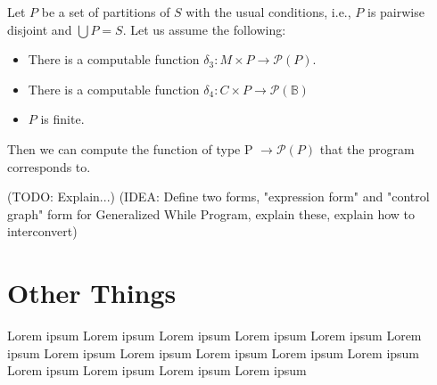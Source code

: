 \documentclass[11pt]{article}
\begin{document}
Let $P$ be a set of partitions of $S$ with the usual conditions, i.e., $P$ is pairwise disjoint and $\bigcup P = S$.  Let us assume the following:

\begin{itemize}
\item There is a computable function $\delta_{3} : M \times P \rightarrow \mathcal{P}(P)$.
\item There is a computable function $\delta_{4} : C \times P \rightarrow \mathcal{P}(\mathbb{B})$
\item $P$ is finite.
\end{itemize}

Then we can compute the function of type P $\rightarrow \mathcal{P}(P)$ that the program corresponds to.

(TODO: Explain...)
(IDEA: Define two forms, "expression form" and "control graph" form for Generalized While Program, explain these, explain how to interconvert)

\section{Other Things}
Lorem ipsum Lorem ipsum Lorem ipsum Lorem ipsum Lorem ipsum Lorem ipsum Lorem ipsum Lorem ipsum Lorem ipsum Lorem ipsum Lorem ipsum Lorem ipsum Lorem ipsum Lorem ipsum Lorem ipsum 
\end{document}
